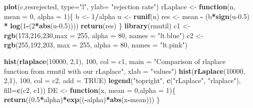 \documentclass[
]{article}
\newenvironment{Shaded}{\begin{snugshade}}{\end{snugshade}}
\newcommand{\ControlFlowTok}[1]{\textcolor[rgb]{0.13,0.29,0.53}{\textbf{#1}}}
\newcommand{\DataTypeTok}[1]{\textcolor[rgb]{0.13,0.29,0.53}{#1}}
\newcommand{\DecValTok}[1]{\textcolor[rgb]{0.00,0.00,0.81}{#1}}
\newcommand{\FloatTok}[1]{\textcolor[rgb]{0.00,0.00,0.81}{#1}}
\newcommand{\KeywordTok}[1]{\textcolor[rgb]{0.13,0.29,0.53}{\textbf{#1}}}
\newcommand{\NormalTok}[1]{#1}
\newcommand{\OperatorTok}[1]{\textcolor[rgb]{0.81,0.36,0.00}{\textbf{#1}}}
\newcommand{\OtherTok}[1]{\textcolor[rgb]{0.56,0.35,0.01}{#1}}
\newcommand{\StringTok}[1]{\textcolor[rgb]{0.31,0.60,0.02}{#1}}
\begin{document}
\begin{Shaded}
\begin{Highlighting}[]
\KeywordTok{plot}\NormalTok{(c,resrejected, }\DataTypeTok{type=}\StringTok{"l"}\NormalTok{, }\DataTypeTok{ylab=} \StringTok{"rejection rate"}\NormalTok{)}
\NormalTok{rLaplace <-}\StringTok{ }\ControlFlowTok{function}\NormalTok{(n, }\DataTypeTok{mean =} \DecValTok{0}\NormalTok{, }\DataTypeTok{alpha =} \DecValTok{1}\NormalTok{)\{}
\NormalTok{  b <-}\StringTok{ }\DecValTok{1}\OperatorTok{/}\NormalTok{alpha}
\NormalTok{  u <-}\StringTok{ }\KeywordTok{runif}\NormalTok{(n)}
\NormalTok{  res <-}\StringTok{ }\NormalTok{mean }\OperatorTok{-}\StringTok{ }\NormalTok{(b}\OperatorTok{*}\KeywordTok{sign}\NormalTok{(u}\FloatTok{-0.5}\NormalTok{) }\OperatorTok{*}\StringTok{ }\KeywordTok{log}\NormalTok{(}\DecValTok{1}\OperatorTok{-}\NormalTok{(}\DecValTok{2}\OperatorTok{*}\KeywordTok{abs}\NormalTok{(u}\FloatTok{-0.5}\NormalTok{))))}
  \KeywordTok{return}\NormalTok{(res)}
\NormalTok{\}}
\KeywordTok{library}\NormalTok{(rmutil)}
\NormalTok{c1 <-}\StringTok{ }\KeywordTok{rgb}\NormalTok{(}\DecValTok{173}\NormalTok{,}\DecValTok{216}\NormalTok{,}\DecValTok{230}\NormalTok{,}\DataTypeTok{max =} \DecValTok{255}\NormalTok{, }\DataTypeTok{alpha =} \DecValTok{80}\NormalTok{, }\DataTypeTok{names =} \StringTok{"lt.blue"}\NormalTok{)}
\NormalTok{c2 <-}\StringTok{ }\KeywordTok{rgb}\NormalTok{(}\DecValTok{255}\NormalTok{,}\DecValTok{192}\NormalTok{,}\DecValTok{203}\NormalTok{, }\DataTypeTok{max =} \DecValTok{255}\NormalTok{, }\DataTypeTok{alpha =} \DecValTok{80}\NormalTok{, }\DataTypeTok{names =} \StringTok{"lt.pink"}\NormalTok{)}

\KeywordTok{hist}\NormalTok{(}\KeywordTok{rlaplace}\NormalTok{(}\DecValTok{10000}\NormalTok{, }\DecValTok{2}\NormalTok{,}\DecValTok{1}\NormalTok{), }\DecValTok{100}\NormalTok{, }
     \DataTypeTok{col =}\NormalTok{ c1,}
     \DataTypeTok{main =} \StringTok{"Comparison of rlaplace function from rmutil with our rLaplace"}\NormalTok{, }
     \DataTypeTok{xlab =} \StringTok{"values"}\NormalTok{)}
\KeywordTok{hist}\NormalTok{(}\KeywordTok{rLaplace}\NormalTok{(}\DecValTok{10000}\NormalTok{, }\DecValTok{2}\NormalTok{,}\DecValTok{1}\NormalTok{), }\DecValTok{100}\NormalTok{, }\DataTypeTok{col =}\NormalTok{ c2, }\DataTypeTok{add =} \OtherTok{TRUE}\NormalTok{)}
\KeywordTok{legend}\NormalTok{(}\StringTok{"topright"}\NormalTok{, }\KeywordTok{c}\NormalTok{(}\StringTok{"rLaplace"}\NormalTok{, }\StringTok{"rlaplace"}\NormalTok{), }\DataTypeTok{fill=}\KeywordTok{c}\NormalTok{(c2, c1))}
\NormalTok{DE <-}\StringTok{ }\ControlFlowTok{function}\NormalTok{(x, }\DataTypeTok{mean =} \DecValTok{0}\NormalTok{,}\DataTypeTok{alpha =} \DecValTok{1}\NormalTok{)\{}
  \KeywordTok{return}\NormalTok{((}\FloatTok{0.5}\OperatorTok{*}\NormalTok{alpha)}\OperatorTok{*}\KeywordTok{exp}\NormalTok{((}\OperatorTok{-}\NormalTok{alpha)}\OperatorTok{*}\KeywordTok{abs}\NormalTok{(x}\OperatorTok{-}\NormalTok{mean)))}
\NormalTok{\}}


\end{Highlighting}
\end{Shaded}
\end{document}

